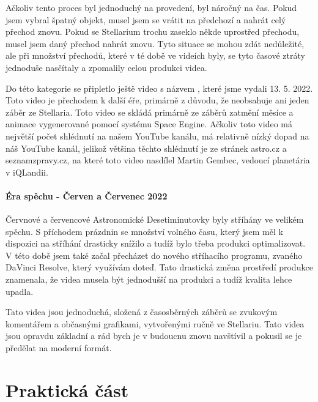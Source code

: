 \documentclass[12pt,a4paper,titlepage]{article}
\begin{document}
Ačkoliv tento proces byl jednoduchý na provedení, byl náročný na čas. Pokud jsem vybral špatný objekt, musel jsem se vrátit na předchozí a nahrát celý přechod znovu. Pokud se Stellarium trochu zaseklo někde uprostřed přechodu, musel jsem daný přechod nahrát znovu. Tyto situace se mohou zdát nedůležité, ale při množství přechodů, které v té době ve videích byly, se tyto časové ztráty jednoduše nasčítaly a zpomalily celou produkci videa.

Do této kategorie se připletlo ještě video s názvem , které jsme vydali 13. 5. 2022. Toto video je přechodem k další éře, primárně z důvodu, že neobsahuje ani jeden záběr ze Stellaria. Toto video se skládá primárně ze záběrů zatmění měsíce a animace vygenerované pomocí systému Space Engine. Ačkoliv toto video má největší počet shlédnutí na našem YouTube kanálu, má relativně nízký dopad na náš YouTube kanál, jelikož většina těchto shlédnutí je ze stránek astro.cz a seznamzpravy.cz, na které toto video nasdílel Martin Gembec, vedoucí planetária v iQLandii.
\subsection{Éra spěchu - Červen a Červenec 2022}
Červnové a červencové Astronomické Desetiminutovky byly stříhány ve velikém spěchu. S příchodem prázdnin se množství volného času, který jsem měl k dispozici na stříhání drasticky snížilo a tudíž bylo třeba produkci optimalizovat. V této době jsem také začal přecházet do nového stříhacího programu, zvaného DaVinci Resolve, který využívám doteď. Tato drastická změna prostředí produkce znamenala, že videa musela být jednodušší na produkci a tudíž kvalita lehce upadla. 

Tato videa jsou jednoduchá, složená z časosběrných záběrů se zvukovým komentářem a občasnými grafikami, vytvořenými ručně ve Stellariu. Tato videa jsou opravdu základní a rád bych je v budoucnu znovu navštívil a pokusil se je předělat na moderní formát. 
\newpage
\part{Praktická část}
\newpage
\end{document}
